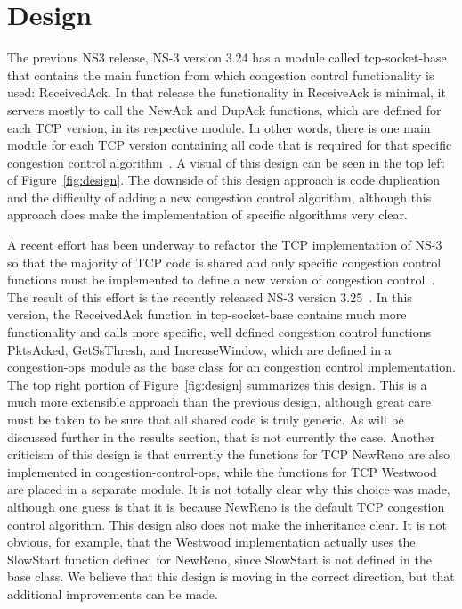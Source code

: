 \documentclass[conference]{IEEEtran}
\begin{document}
\section{Design}

The previous NS3 release, NS-3 version 3.24 has a module called tcp-socket-base that contains the main function from which congestion control functionality is used: ReceivedAck. In that release the functionality in ReceiveAck is minimal, it servers mostly to call the NewAck and DupAck functions, which are defined for each TCP version, in its respective module. In other words, there is one main module for each TCP version containing all code that is required for that specific congestion control algorithm~\cite{NS324Code}. A visual of this design can be seen in the top left of Figure~\ref{fig:design}. The downside of this design approach is code duplication and the difficulty of adding a new congestion control algorithm, although this approach does make the implementation of specific algorithms very clear. 

A recent effort has been underway to refactor the TCP implementation of NS-3 so that the majority of TCP code is shared and only specific congestion control functions must be implemented to define a new version of congestion control~\cite{NS3Patch}. The result of this effort is the recently released NS-3 version 3.25~\cite{NS325Code}. In this version, the ReceivedAck function in tcp-socket-base contains much more functionality and calls more specific, well defined congestion control functions PktsAcked, GetSsThresh, and IncreaseWindow, which are defined in a congestion-ops module as the base class for an congestion control implementation. The top right portion of Figure~\ref{fig:design} summarizes this design. This is a much more extensible approach than the previous design, although great care must be taken to be sure that all shared code is truly generic. As will be discussed further in the results section, that is not currently the case. Another criticism of this design is that currently the functions for TCP NewReno are also implemented in congestion-control-ops, while the functions for TCP Westwood are placed in a separate module. It is not totally clear why this choice was made, although one guess is that it is because NewReno is the default TCP congestion control algorithm. This design also does not make the inheritance clear. It is not obvious, for example, that the Westwood implementation actually uses the SlowStart function defined for NewReno, since SlowStart is not defined in the base class. We believe that this design is moving in the correct direction, but that additional improvements can be made. 
\end{document}
